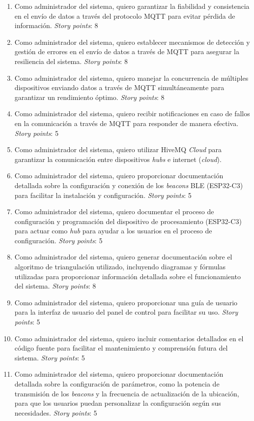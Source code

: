 \documentclass[
11pt, %
]{charter}
\begin{document}
\begin{enumerate}
	\item Como administrador del sistema, quiero garantizar la fiabilidad y consistencia en el envío de datos a través del protocolo MQTT para evitar pérdida de información. \textit{Story points}: 8
	\item Como administrador del sistema, quiero establecer mecanismos de detección y gestión de errores en el envío de datos a través de MQTT para asegurar la resiliencia del sistema. \textit{Story points}: 8
	\item Como administrador del sistema, quiero manejar la concurrencia de múltiples dispositivos enviando datos a través de MQTT simultáneamente para garantizar un rendimiento óptimo. \textit{Story points}: 8
	\item Como administrador del sistema, quiero recibir notificaciones en caso de fallos en la comunicación a través de MQTT para responder de manera efectiva. \textit{Story points}: 5
	\item Como administrador del sistema, quiero utilizar HiveMQ \textit{Cloud} para garantizar la comunicación entre dispositivos \textit{hubs} e internet (\textit{cloud}).
	\item Como administrador del sistema, quiero proporcionar documentación detallada sobre la configuración y conexión de los \textit{beacons} BLE (ESP32-C3) para facilitar la instalación y configuración. \textit{Story points}: 5
	\item Como administrador del sistema, quiero documentar el proceso de configuración y programación del dispositivo de procesamiento (ESP32-C3) para actuar como \textit{hub} para ayudar a los usuarios en el proceso de configuración. \textit{Story points}: 5
	\item Como administrador del sistema, quiero generar documentación sobre el algoritmo de triangulación utilizado, incluyendo diagramas y fórmulas utilizadas para proporcionar información detallada sobre el funcionamiento del sistema. \textit{Story points}: 8
	\item Como administrador del sistema, quiero proporcionar una guía de usuario para la interfaz de usuario del panel de control para facilitar su uso. \textit{Story points}: 5
	\item Como administrador del sistema, quiero incluir comentarios detallados en el código fuente para facilitar el mantenimiento y comprensión futura del sistema. \textit{Story points}: 5
	\item Como administrador del sistema, quiero proporcionar documentación detallada sobre la configuración de parámetros, como la potencia de transmisión de los \textit{beacons} y la frecuencia de actualización de la ubicación, para que los usuarios puedan personalizar la configuración según sus necesidades. \textit{Story points}: 5

\end{enumerate}
\end{document}
